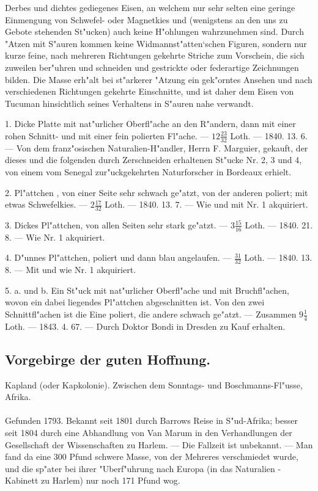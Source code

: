 \documentclass[a4paper, 11pt, oneside, polutonikogreek, german]{article}
\begin{document}
Derbes und dichtes gediegenes Eisen, an welchem nur sehr selten eine geringe Einmengung von Schwefel- oder Magnetkies und (wenigstens an den uns zu Gebote stehenden St"ucken) auch keine H"ohlungen wahrzunehmen sind. Durch "Atzen mit S"auren kommen keine Widmannst"atten‘schen Figuren, sondern nur kurze feine, nach mehreren Richtungen gekehrte Striche zum Vorschein, die sich zuweilen ber"uhren und schneiden und gestrickte oder federartige Zeichnungen bilden. Die Masse erh"alt bei st"arkerer "Atzung ein gek"orntes Ansehen und nach verschiedenen Richtungen gekehrte Einschnitte, und ist daher dem Eisen von Tucuman hinsichtlich seines Verhaltens in S"auren nahe verwandt.

1. Dicke Platte mit nat"urlicher Oberfl"ache an den R"andern, dann mit einer rohen Schnitt- und mit einer fein polierten Fl"ache. --- $12\frac{23}{32}$ Loth. --- 1840. 13. 6. --- Von dem franz"osischen Naturalien-H"andler, Herrn F. Marguier, gekauft, der dieses und die folgenden durch Zerschneiden erhaltenen St"ucke Nr. 2, 3 und 4, von einem vom Senegal zur"uckgekehrten Naturforscher in Bordeaux erhielt.

2. Pl"attchen , von einer Seite sehr schwach ge"atzt, von der anderen poliert; mit etwas Schwefelkies. --- $2\frac{17}{32}$ Loth. --- 1840. 13. 7. --- Wie und mit Nr. 1 akquiriert.

3. Dickes Pl"attchen, von allen Seiten sehr stark ge"atzt. --- $3\frac{15}{16}$ Loth. --- 1840. 21. 8. --- Wie Nr. 1 akquiriert.

4. D"unnes Pl"attchen, poliert und dann blau angelaufen. --- $\frac{31}{32}$ Loth. --- 1840. 13. 8. --- Mit und wie Nr. 1 akquiriert.

5. a. und b. Ein St"uck mit nat"urlicher Oberfl"ache und mit Bruchfl"achen, wovon ein dabei liegendes Pl"attchen abgeschnitten ist. Von den zwei Schnittfl"achen ist die Eine poliert, die andere schwach ge"atzt. --- Zusammen $9\frac{1}{4}$ Loth. --- 1843. 4. 67. --- Durch Doktor Bondi in Dresden zu Kauf erhalten.
\subsection{Vorgebirge der guten Hoffnung.}
\begin{center}
\small
Kapland (oder Kapkolonie). Zwischen dem Sonntags- und Boschmanns-Fl"usse, Afrika.
\end{center}
\paragraph{}
Gefunden 1793. Bekannt seit 1801 durch Barrows Reise in S"ud-Afrika; besser seit 1804 durch eine Abhandlung von Van Marum in den Verhandlungen der Gesellschaft der Wissenschaften zu Harlem. --- Die Fallzeit ist unbekannt. --- Man fand da eine 300 Pfund schwere Masse, von der Mehreres verschmiedet wurde, und die sp"ater bei ihrer "Uberf"uhrung nach Europa (in das Naturalien -Kabinett zu Harlem) nur noch 171 Pfund wog.
\end{document}
